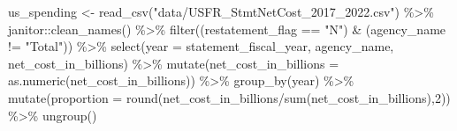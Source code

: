 \documentclass[
  letterpaper,
]{book}
\newenvironment{Shaded}{\begin{snugshade}}{\end{snugshade}}
\newcommand{\AttributeTok}[1]{\textcolor[rgb]{0.40,0.45,0.13}{#1}}
\newcommand{\DecValTok}[1]{\textcolor[rgb]{0.68,0.00,0.00}{#1}}
\newcommand{\FunctionTok}[1]{\textcolor[rgb]{0.28,0.35,0.67}{#1}}
\newcommand{\NormalTok}[1]{\textcolor[rgb]{0.00,0.23,0.31}{#1}}
\newcommand{\OtherTok}[1]{\textcolor[rgb]{0.00,0.23,0.31}{#1}}
\newcommand{\SpecialCharTok}[1]{\textcolor[rgb]{0.37,0.37,0.37}{#1}}
\newcommand{\StringTok}[1]{\textcolor[rgb]{0.13,0.47,0.30}{#1}}
\begin{document}
\begin{Shaded}
\begin{Highlighting}[]
\NormalTok{us\_spending }\OtherTok{\textless{}{-}} \FunctionTok{read\_csv}\NormalTok{(}\StringTok{"data/USFR\_StmtNetCost\_2017\_2022.csv"}\NormalTok{) }\SpecialCharTok{\%\textgreater{}\%}\NormalTok{ janitor}\SpecialCharTok{::}\FunctionTok{clean\_names}\NormalTok{() }\SpecialCharTok{\%\textgreater{}\%} \FunctionTok{filter}\NormalTok{((restatement\_flag }\SpecialCharTok{==} \StringTok{"N"}\NormalTok{) }\SpecialCharTok{\&}\NormalTok{ (agency\_name }\SpecialCharTok{!=} \StringTok{"Total"}\NormalTok{)) }\SpecialCharTok{\%\textgreater{}\%} \FunctionTok{select}\NormalTok{(}\AttributeTok{year =}\NormalTok{ statement\_fiscal\_year, agency\_name, net\_cost\_in\_billions) }\SpecialCharTok{\%\textgreater{}\%} \FunctionTok{mutate}\NormalTok{(}\AttributeTok{net\_cost\_in\_billions =} \FunctionTok{as.numeric}\NormalTok{(net\_cost\_in\_billions)) }\SpecialCharTok{\%\textgreater{}\%} \FunctionTok{group\_by}\NormalTok{(year) }\SpecialCharTok{\%\textgreater{}\%} \FunctionTok{mutate}\NormalTok{(}\AttributeTok{proportion =} \FunctionTok{round}\NormalTok{(net\_cost\_in\_billions}\SpecialCharTok{/}\FunctionTok{sum}\NormalTok{(net\_cost\_in\_billions),}\DecValTok{2}\NormalTok{)) }\SpecialCharTok{\%\textgreater{}\%} \FunctionTok{ungroup}\NormalTok{()}


\end{Highlighting}
\end{Shaded}
\end{document}
